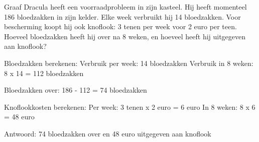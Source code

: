\begin{opgave}
Graaf Dracula heeft een voorraadprobleem in zijn kasteel. Hij heeft momenteel 
186 bloedzakken in zijn kelder. Elke week verbruikt hij 14 bloedzakken. Voor 
bescherming koopt hij ook knoflook: 3 tenen per week voor 2 euro per teen. 
Hoeveel bloedzakken heeft hij over na 8 weken, en hoeveel heeft hij uitgegeven 
aan knoflook?
\end{opgave}

\begin{oplossing}
Bloedzakken berekenen:
Verbruik per week: 14 bloedzakken
Verbruik in 8 weken: 8 x 14 = 112 bloedzakken

Bloedzakken over:
186 - 112 = 74 bloedzakken

Knoflookkosten berekenen:
Per week: 3 tenen x 2 euro = 6 euro
In 8 weken: 8 x 6 = 48 euro

Antwoord: 74 bloedzakken over en 48 euro uitgegeven aan knoflook
\end{oplossing}